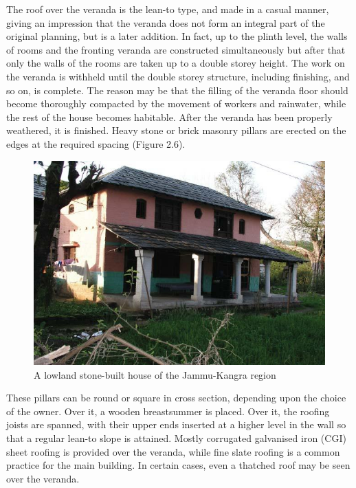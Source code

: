 The roof over the veranda is the lean-to type, and made in a casual manner, giving an impression that the veranda does not form an integral part of the original planning, but is a later addition. In fact, up to the plinth level, the walls of rooms and the fronting veranda are constructed simultaneously but after that only the walls of the rooms are taken up to a double storey height. The work on the veranda is withheld until the double storey structure, including finishing, and so on, is complete. The reason may be that the filling of the veranda floor should become thoroughly compacted by the movement of workers and rainwater, while the rest of the house becomes habitable. After the veranda has been properly weathered, it is finished. Heavy stone or brick masonry pillars are erected on the edges at the required spacing (Figure 2.6).

\begin{figure}[!htbp]
\includegraphics[scale=.35]{images/chap02-06.jpg}
\caption{A lowland stone-built house of the Jammu-Kangra region}\label{chap02-fig06}
\end{figure}

These pillars can be round or square in cross section, depending upon the choice of the owner. Over it, a wooden breastsummer is placed. Over it, the roofing joists are spanned, with their upper ends inserted at a higher level in the wall so that a regular lean-to slope is attained. Mostly corrugated galvanised iron (CGI) sheet roofing is provided over the veranda, while fine slate roofing is a common practice for the main building. In certain cases, even a thatched roof may be seen over the veranda.

